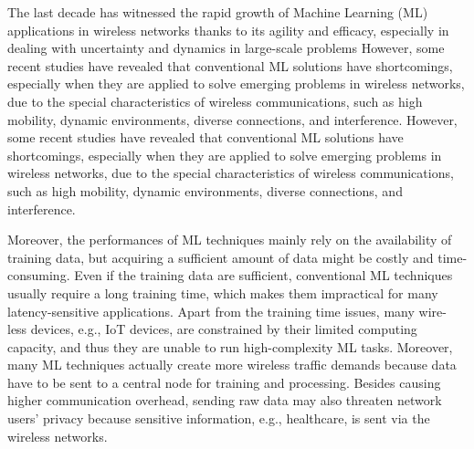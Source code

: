 \documentclass[letterpaper%
, twoside%
, 12pt%
,thesepararticles%
, english%
,creativecommons,hyperref, withAlgo2e%
]{thETS}
\begin{document}
\begin{introduction}

The last decade has witnessed the rapid growth of Machine Learning (ML) applications in wireless networks thanks to its agility and efficacy, especially in dealing with uncertainty and dynamics in large-scale problems
    \cite{8743390} \cite{6336689}
However, some recent studies have revealed that conventional ML solutions have shortcomings, especially when they are applied to solve emerging problems in wireless networks, due to the special characteristics of wireless communications, such as high mobility, dynamic environments, diverse connections, and interference. However, some recent studies have revealed that conventional ML solutions have shortcomings, especially when they are applied to solve emerging problems in wireless networks, due to the special characteristics of wireless communications, such as high mobility, dynamic environments, diverse connections, and interference.

Moreover, the performances of ML techniques mainly rely on the availability of training data, but acquiring a sufficient amount of data might be costly and time-consuming. Even if the training data are sufficient, conventional ML techniques usually require a long training time, which makes them impractical for many latency-sensitive applications. Apart from the training time issues, many wire- less devices, e.g., IoT devices, are constrained by their limited computing capacity, and thus they are unable to run high-complexity ML tasks. Moreover, many ML techniques actually create more wireless traffic demands because data have to be sent to a central node for training and processing. Besides causing higher communication overhead, sending raw data may also threaten network users' privacy because sensitive information, e.g., healthcare, is sent via the wireless networks.


\end{introduction}
\end{document}
